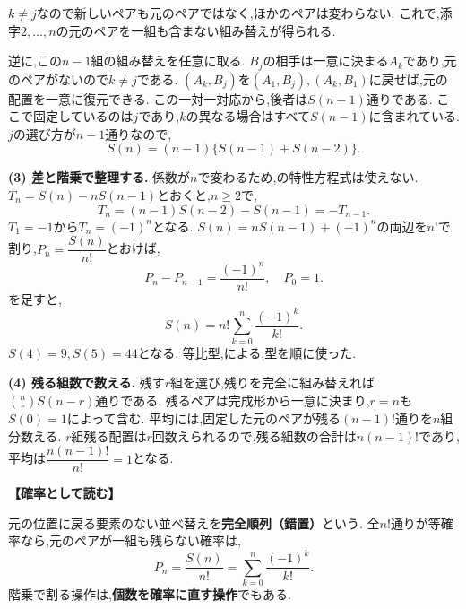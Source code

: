 \begin{enumerate}[label=\textbf{問\arabic*.},leftmargin=3.8em,format=\bookitemlink{practice-entrance}{solution}{problem}]
                  $k\ne j$なので新しいペアも元のペアではなく,ほかのペアは変わらない.
                  これで,添字$2,\ldots,n$の元のペアを一組も含まない組み替えが得られる.
                  \par
                  逆に,この$n-1$組の組み替えを任意に取る.
                  $B_j$の相手は一意に決まる$A_k$であり,元のペアがないので$k\ne j$である.
                  $(A_k,B_j)$を$(A_1,B_j),(A_k,B_1)$に戻せば,元の配置を一意に復元できる.
                  この一対一対応から,後者は$S(n-1)$通りである.
                  ここで固定しているのは$j$であり,$k$の異なる場合はすべて$S(n-1)$に含まれている.
                  $j$の選び方が$n-1$通りなので,
                  \[
                    S(n)=(n-1)\{S(n-1)+S(n-2)\}.
                  \]
                  \par\smallskip\textbf{(3) 差と階乗で整理する.}
                  係数が$n$で変わるため,の特性方程式は使えない.
                  $T_n=S(n)-nS(n-1)$とおくと,$n\ge2$で,
                  \[
                    T_n=(n-1)S(n-2)-S(n-1)=-T_{n-1}.
                  \]
                  $T_1=-1$から$T_n=(-1)^n$となる.
                  $S(n)=nS(n-1)+(-1)^n$の両辺を$n!$で割り,$P_n=\dfrac{S(n)}{n!}$とおけば,
                  \[
                    P_n-P_{n-1}=\frac{(-1)^n}{n!},\quad P_0=1.
                  \]
                  を足すと,
                  \[
                    S(n)=n!\sum_{k=0}^n\frac{(-1)^k}{k!}.
                  \]
                  $S(4)=9,S(5)=44$となる.
                  等比型,による,型を順に使った.
                  \par\smallskip\textbf{(4) 残る組数で数える.}
                  残す$r$組を選び,残りを完全に組み替えれば$\binom nrS(n-r)$通りである.
                  残るペアは完成形から一意に決まり,$r=n$も$S(0)=1$によって含む.
                  平均には,固定した元のペアが残る$(n-1)!$通りを$n$組分数える.
                  $r$組残る配置は$r$回数えられるので,残る組数の合計は$n(n-1)!$であり,平均は$\dfrac{n(n-1)!}{n!}=1$となる.
                  \par\smallskip\noindent\textbf{【確率として読む】}\par\nopagebreak[4]
                  元の位置に戻る要素のない並べ替えを\textbf{完全順列（錯置）}という.
                  全$n!$通りが等確率なら,元のペアが一組も残らない確率は,
                  \[
                    P_n=\frac{S(n)}{n!}=\sum_{k=0}^n\frac{(-1)^k}{k!}.
                  \]
                  階乗で割る操作は,\textbf{個数を確率に直す操作}でもある.

\end{enumerate}
